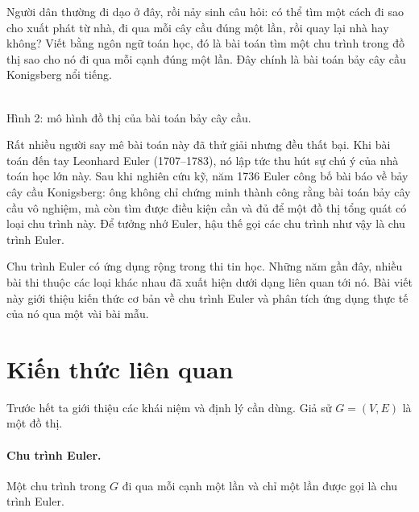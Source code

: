 \documentclass[11pt]{article}
\begin{document}
Người dân thường đi dạo ở đây, rồi nảy sinh câu hỏi: có thể tìm một cách đi
sao cho xuất phát từ nhà, đi qua mỗi cây cầu đúng một lần, rồi quay lại nhà
hay không? Viết bằng ngôn ngữ toán học, đó là bài toán tìm một chu trình trong
đồ thị sao cho nó đi qua mỗi cạnh đúng một lần. Đây chính là bài toán bảy cây
cầu Konigsberg nổi tiếng.

\begin{center}
\\
\small Hình 2: mô hình đồ thị của bài toán bảy cây cầu.
\end{center}

Rất nhiều người say mê bài toán này đã thử giải nhưng đều thất bại. Khi bài
toán đến tay Leonhard Euler (1707--1783), nó lập tức thu hút sự chú ý của nhà
toán học lớn này. Sau khi nghiên cứu kỹ, năm 1736 Euler công bố bài báo về
bảy cây cầu Konigsberg: ông không chỉ chứng minh thành công rằng bài toán bảy
cây cầu vô nghiệm, mà còn tìm được điều kiện cần và đủ để một đồ thị tổng quát
có loại chu trình này. Để tưởng nhớ Euler, hậu thế gọi các chu trình như vậy
là chu trình Euler.

Chu trình Euler có ứng dụng rộng trong thi tin học. Những năm gần đây, nhiều
bài thi thuộc các loại khác nhau đã xuất hiện dưới dạng liên quan tới nó. Bài
viết này giới thiệu kiến thức cơ bản về chu trình Euler và phân tích ứng dụng
thực tế của nó qua một vài bài mẫu.

\section{Kiến thức liên quan}

Trước hết ta giới thiệu các khái niệm và định lý cần dùng. Giả sử
\(G=(V,E)\) là một đồ thị.

\paragraph{Chu trình Euler.}
Một chu trình trong \(G\) đi qua mỗi cạnh một lần và chỉ một lần được gọi là
chu trình Euler.
\end{document}
